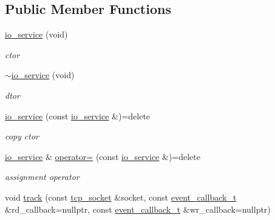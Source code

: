 \subsection*{Public Member Functions}
\begin{DoxyCompactItemize}
\item 
\mbox{\label{classtacopie_1_1io__service_a4cd4a873cb4457cdc28bd2d00665d15a}} 
\hyperlink{classtacopie_1_1io__service_a4cd4a873cb4457cdc28bd2d00665d15a}{io\+\_\+service} (void)
\begin{DoxyCompactList}\small\item\em ctor \end{DoxyCompactList}\item 
\mbox{\label{classtacopie_1_1io__service_ae423d7e4b13f07fe41fb051345ffbf8d}} 
\hyperlink{classtacopie_1_1io__service_ae423d7e4b13f07fe41fb051345ffbf8d}{$\sim$io\+\_\+service} (void)
\begin{DoxyCompactList}\small\item\em dtor \end{DoxyCompactList}\item 
\mbox{\label{classtacopie_1_1io__service_ad5da7503d8fec083c6d28455ec9e21c7}} 
\hyperlink{classtacopie_1_1io__service_ad5da7503d8fec083c6d28455ec9e21c7}{io\+\_\+service} (const \hyperlink{classtacopie_1_1io__service}{io\+\_\+service} \&)=delete
\begin{DoxyCompactList}\small\item\em copy ctor \end{DoxyCompactList}\item 
\mbox{\label{classtacopie_1_1io__service_a980652008516b38357d405c16eda07fa}} 
\hyperlink{classtacopie_1_1io__service}{io\+\_\+service} \& \hyperlink{classtacopie_1_1io__service_a980652008516b38357d405c16eda07fa}{operator=} (const \hyperlink{classtacopie_1_1io__service}{io\+\_\+service} \&)=delete
\begin{DoxyCompactList}\small\item\em assignment operator \end{DoxyCompactList}\item 
void \hyperlink{classtacopie_1_1io__service_a9f4c8bce3c0f6d660515b0b5eb109df8}{track} (const \hyperlink{classtacopie_1_1tcp__socket}{tcp\+\_\+socket} \&socket, const \hyperlink{classtacopie_1_1io__service_abb66850c32d9c724f4418d77bd04bcfd}{event\+\_\+callback\+\_\+t} \&rd\+\_\+callback=nullptr, const \hyperlink{classtacopie_1_1io__service_abb66850c32d9c724f4418d77bd04bcfd}{event\+\_\+callback\+\_\+t} \&wr\+\_\+callback=nullptr)

\end{DoxyCompactItemize}
